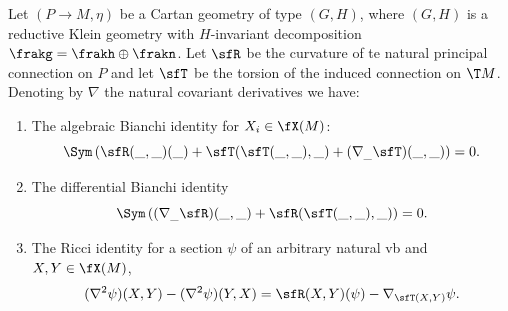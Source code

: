 \begin{cor}\label{cor 1.5.9 Cap}
    Let $(P\to M,\eta)$ be a Cartan geometry of type $(G,H)$, where $(G,H)$ is a reductive Klein geometry with $H$-invariant decomposition $\frakg=\frakh\oplus\frakn$. Let $\sfR$ be the curvature of te natural principal connection on $P$ and let $\sfT$ be the torsion of the induced connection on $\T M$. Denoting by $\nabla$ the natural covariant derivatives we have: 
    \begin{enumerate}[label=(\arabic*)]
        \item The algebraic Bianchi identity for $X_i\in\fX(M)$:
        \[\Sym\left(\sfR(\_,\_)(\_)+\sfT(\sfT(\_,\_),\_)+(\nabla_{\_}\sfT)(\_,\_)\right)=0.\]
        \item The differential Bianchi identity 
        \[\Sym\left((\nabla_{\_}\sfR)(\_,\_)+\sfR(\sfT(\_,\_),\_)\right)=0.\]
        \item The Ricci identity for a section $\psi$ of an arbitrary natural \gls{vb} and $X,Y\in\fX(M)$,
        \[(\nabla^2\psi)(X,Y)-(\nabla^2\psi)(Y,X)=\sfR(X,Y)(\psi)-\nabla_{\sfT(X,Y)}\psi.\]
    \end{enumerate}
\end{cor}
